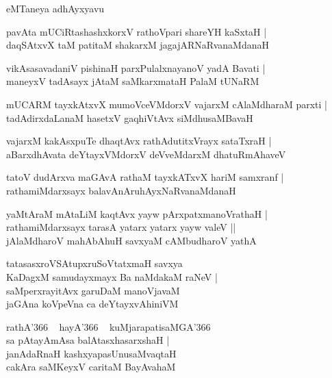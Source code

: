 \documentclass[twoside,12pt,openright]{book}
\newcounter{shloka}[chapter]
\begin{document}
\begin{center}
eMTaneya adhAyxyavu
\end{center}

\begin{shloka}%
pavAta mUCiRtashashxkorxV rathoVpari shareYH kaSxtaH |\\
daqSAtxvX taM patitaM shakarxM jagajARNaRvanaMdanaH
\end{shloka}

\begin{shloka}%
vikAsasavadaniV pishinaH parxPulalxnayanoV yadA Bavati |\\
maneyxV tadAsayx jAtaM saMkarxmataH PalaM tUNaRM
\end{shloka}

\begin{shloka}%
mUCARM tayxkAtxvX mumoVceVMdorxV vajarxM cAlaMdharaM parxti |\\
tadAdirxdaLanaM hasetxV gaqhiVtAvx siMdhusaMBavaH 
\end{shloka}

\begin{shloka}%
vajarxM kakAsxpuTe dhaqtAvx rathAdutitxVrayx sataTxraH |\\
aBarxdhAvata deYtayxVMdorxV deVveMdarxM dhatuRmAhaveV
\end{shloka}

\begin{shloka}%
tatoV dudArxva maGAvA rathaM tayxkATxvX hariM samxranf |\\
rathamiMdarxsayx balavAnAruhAyxNaRvanaMdanaH
\end{shloka}

\begin{shloka}%
yaMtAraM mAtaLiM kaqtAvx yayw pArxpatxmanoVrathaH |\\
rathamiMdarxsayx tarasA yatarx yatarx yayw valeV ||\\
jAlaMdharoV mahAbAhuH savxyaM cAMbudharoV yathA 
\end{shloka}

\begin{shloka}%
tatasasxroVSAtupxruSoVtatxmaH savxya \\
KaDagxM samudayxmayx Ba naMdakaM raNeV |\\
saMperxrayitAvx garuDaM manoVjavaM \\
jaGAna koVpeVna ca deYtayxvAhiniVM 
\end{shloka}

\begin{shloka}%
rathA\char'366 ~ hayA\char'366 ~ kuMjarapatisaMGA\char'366 \\
sa pAtayAmAsa balAtasxhasarxshaH |\\
janAdaRnaH kashxyapasUnusaMvaqtaH \\
cakAra saMKeyxV caritaM BayAvahaM 
\end{shloka}
\end{document}
